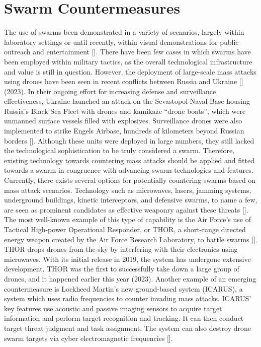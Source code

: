 \section*{Swarm Countermeasures}

The use of swarms been demonstrated in a variety of scenarios, largely within laboratory settings or until recently, within visual demonstrations for public outreach and entertainment []. There have been few cases in which swarms have been employed within military tactics, as the overall technological infrastructure and value is still in question. However, the deployment of large-scale mass attacks using drones have been seen in recent conflicts between Russia and Ukraine [] (2023). In their ongoing effort for increasing defense and surveillance effectiveness, Ukraine launched an attack on the Sevastopol Naval Base housing Russia’s Black Sea Fleet with drones and kamikaze “drone boats”, which were unmanned surface vessels filled with explosives. Surveillance drones were also implemented to strike Engels Airbase, hundreds of kilometers beyond Russian borders []. Although these units were deployed in large numbers, they still lacked the technological sophistication to be truly considered a swarm. Therefore, existing technology towards countering mass attacks should be applied and fitted towards a swarm in congruence with advancing swarm technologies and features. 
Currently, there exists several options for potentially countering swarms based on mass attack scenarios. Technology such as microwaves, lasers, jamming systems, underground buildings, kinetic interceptors, and defensive swarms, to name a few, are seen as prominent candidates as effective weaponry against these threats []. The most well-known example of this type of capability is the Air Force's use of Tactical High-power Operational Responder, or THOR, a short-range directed energy weapon created by the Air Force Research Laboratory, to battle swarms []. THOR drops drones from the sky by interfering with their electronics using microwaves. With its initial release in 2019, the system has undergone extensive development. THOR was the first to successfully take down a large group of drones, and it happened earlier this year (2023). Another example of an emerging countermeasure is Lockheed Martin’s new ground-based system (ICARUS), a system which uses radio frequencies to counter invading mass attacks. ICARUS’ key features use acoustic and passive imaging sensors to acquire target information and perform target recognition and tracking. It can then conduct target threat judgment and task assignment. The system can also destroy drone swarm targets via cyber electromagnetic frequencies []. 
